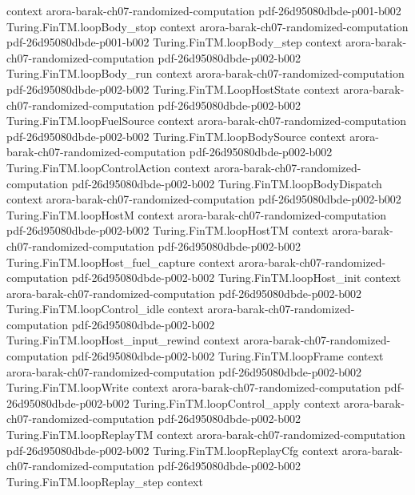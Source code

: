 \begin{theorem}
  {context}
  {arora-barak-ch07-randomized-computation}
  {pdf-26d95080dbde-p001-b002}
\proofstep
  {Turing.FinTM.loopBody_stop}
  {context}
  {arora-barak-ch07-randomized-computation}
  {pdf-26d95080dbde-p001-b002}
\proofstep
  {Turing.FinTM.loopBody_step}
  {context}
  {arora-barak-ch07-randomized-computation}
  {pdf-26d95080dbde-p002-b002}
\proofstep
  {Turing.FinTM.loopBody_run}
  {context}
  {arora-barak-ch07-randomized-computation}
  {pdf-26d95080dbde-p002-b002}
\proofstep
  {Turing.FinTM.LoopHostState}
  {context}
  {arora-barak-ch07-randomized-computation}
  {pdf-26d95080dbde-p002-b002}
\proofstep
  {Turing.FinTM.loopFuelSource}
  {context}
  {arora-barak-ch07-randomized-computation}
  {pdf-26d95080dbde-p002-b002}
\proofstep
  {Turing.FinTM.loopBodySource}
  {context}
  {arora-barak-ch07-randomized-computation}
  {pdf-26d95080dbde-p002-b002}
\proofstep
  {Turing.FinTM.loopControlAction}
  {context}
  {arora-barak-ch07-randomized-computation}
  {pdf-26d95080dbde-p002-b002}
\proofstep
  {Turing.FinTM.loopBodyDispatch}
  {context}
  {arora-barak-ch07-randomized-computation}
  {pdf-26d95080dbde-p002-b002}
\proofstep
  {Turing.FinTM.loopHostM}
  {context}
  {arora-barak-ch07-randomized-computation}
  {pdf-26d95080dbde-p002-b002}
\proofstep
  {Turing.FinTM.loopHostTM}
  {context}
  {arora-barak-ch07-randomized-computation}
  {pdf-26d95080dbde-p002-b002}
\proofstep
  {Turing.FinTM.loopHost_fuel_capture}
  {context}
  {arora-barak-ch07-randomized-computation}
  {pdf-26d95080dbde-p002-b002}
\proofstep
  {Turing.FinTM.loopHost_init}
  {context}
  {arora-barak-ch07-randomized-computation}
  {pdf-26d95080dbde-p002-b002}
\proofstep
  {Turing.FinTM.loopControl_idle}
  {context}
  {arora-barak-ch07-randomized-computation}
  {pdf-26d95080dbde-p002-b002}
\proofstep
  {Turing.FinTM.loopHost_input_rewind}
  {context}
  {arora-barak-ch07-randomized-computation}
  {pdf-26d95080dbde-p002-b002}
\proofstep
  {Turing.FinTM.loopFrame}
  {context}
  {arora-barak-ch07-randomized-computation}
  {pdf-26d95080dbde-p002-b002}
\proofstep
  {Turing.FinTM.loopWrite}
  {context}
  {arora-barak-ch07-randomized-computation}
  {pdf-26d95080dbde-p002-b002}
\proofstep
  {Turing.FinTM.loopControl_apply}
  {context}
  {arora-barak-ch07-randomized-computation}
  {pdf-26d95080dbde-p002-b002}
\proofstep
  {Turing.FinTM.loopReplayTM}
  {context}
  {arora-barak-ch07-randomized-computation}
  {pdf-26d95080dbde-p002-b002}
\proofstep
  {Turing.FinTM.loopReplayCfg}
  {context}
  {arora-barak-ch07-randomized-computation}
  {pdf-26d95080dbde-p002-b002}
\proofstep
  {Turing.FinTM.loopReplay_step}
  {context}

\end{theorem}
